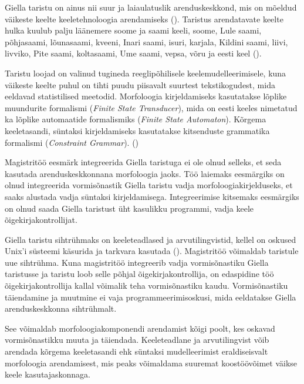 \documentclass[12pt,a4paper]{article}
\begin{document}
Giella taristu on ainus nii suur ja laia\-ulatuslik arendus\-keskkond, mis on mõeldud väikeste keelte keele\-tehnoloogia arendamiseks (\cite[346]{moshagen_building_2013}). Taristus arendatavate keelte hulka kuulub palju lääne\-mere soome ja saami keeli, soome, Lule saami, põhjasaami, lõunasaami, kveeni, Inari saami, isuri, karjala, Kildini saami, liivi, livviko, Pite saami, kolta\-saami, Ume saami, vepsa, võru ja eesti keel  (\cite[349]{moshagen_building_2013}).

Taristu loojad on valinud tugineda reegli\-põhilisele keele\-mudelleerimisele, kuna väikeste keelte puhul on tihti puudu piisavalt suurtest teksti\-kogudest, mida eeldavad statistilised meetodid. Morfoloogia kirjeldamiseks kasutatakse lõplike muundurite formalismi (\textit{Finite State Transducer}), mida on eesti keeles nimetatud ka lõplike automaatide formalismiks (\textit{Finite State Automaton}). Kõrgema keele\-tasandi, süntaksi kirjeldamiseks kasutatakse kitsenduste grammatika formalismi (\textit{Constraint Grammar}). (\cite[346]{moshagen_building_2013})

Magistritöö eesmärk integreerida Giella taristuga ei ole olnud selleks, et seda kasutada arendus\-keskkonnana morfoloogia jaoks. Töö laiemaks eesmärgiks on olnud integreerida vormi\-sõnastik Giella taristu vadja morfoloogia\-kirjelduseks, et saaks alustada vadja süntaksi kirjeldamisega. Integreerimise kitsemaks eesmärgiks on olnud saada Giella taristust üht kasulikku programmi, vadja keele õige\-kirja\-kontrollijat. 

Giella taristu sihtrühmaks on keeleteadlased ja arvuti\-lingvistid, kellel on oskused Unix'i süsteemi käsurida ja tarkvara kasutada (\cite[347]{moshagen_building_2013}). Magistri\-töö võimaldab taristule uue sihtrühma. Kuna magistri\-töö integreerib vadja vormi\-sõnastiku Giella taristusse ja taristu loob selle põhjal õige\-kirja\-kontrollija, on edas\-pidine töö õige\-kirja\-kontrollija kallal võimalik teha vormi\-sõnastiku kaudu. Vormi\-sõnastiku täiendamine ja muutmine ei vaja programmeerimis\-oskusi, mida eeldatakse Giella arendus\-keskkonna siht\-rühmalt. %

See võimaldab morfoloogia\-komponendi arendamist kõigi poolt, kes oskavad vormisõnastikku muuta ja täiendada. Keele\-teadlane ja arvuti\-lingvist võib arendada kõrgema keele\-tasandi ehk süntaksi mudelleerimist eraldi\-seisvalt morfoloogia arendamisest, mis peaks võimaldama suuremat koos\-töö\-võimet väikse keele kasutajas\-konnaga.
\end{document}
